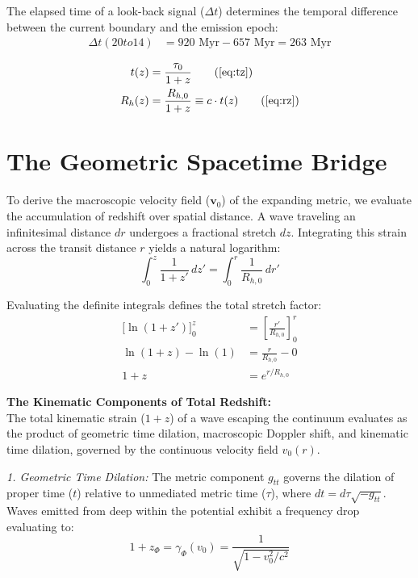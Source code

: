 The elapsed time of a look-back signal ($\Delta t$) determines the temporal difference between the current boundary and the emission epoch:
\begin{align}
    \Delta t(20 to 14) &= 920 \text{ Myr} - 657 \text{ Myr} =  263 \text{ Myr}
\end{align}

\begin{tcolorbox}[recallbox, title={\ref{box:chronometer}. The Redshift Chronometer}]
\begin{align}
    t(z) &= \frac{\tau_0}{1+z} \tag{\ref{eq:tz}} \\
    R_h(z) &= \frac{R_{h,0}}{1+z} \equiv c \cdot t(z) \tag{\ref{eq:rz}}
\end{align}
\end{tcolorbox}


\section{The Geometric Spacetime Bridge}
\label{sec:deriv_gr_bridge}
To derive the macroscopic velocity field ($\mathbf{v}_0$) of the expanding metric, we evaluate the accumulation of redshift over spatial distance. A wave traveling an infinitesimal distance $dr$ undergoes a fractional stretch $dz$. Integrating this strain across the transit distance $r$ yields a natural logarithm:
\begin{equation}
    \int_0^z \frac{1}{1+z'} \, dz' = \int_0^r \frac{1}{R_{h,0}} \, dr'
\end{equation}

Evaluating the definite integrals defines the total stretch factor:
\begin{align}
    \Big[ \ln(1+z') \Big]_0^z &= \left[ \frac{r'}{R_{h,0}} \right]_0^r \\
    \ln(1+z) - \ln(1) &= \frac{r}{R_{h,0}} - 0 \\
    1+z &= e^{r/R_{h,0}}
\end{align}

\vspace{0.2cm}
\textbf{The Kinematic Components of Total Redshift:} \\
The total kinematic strain ($1+z$) of a wave escaping the continuum evaluates as the product of geometric time dilation, macroscopic Doppler shift, and kinematic time dilation, governed by the continuous velocity field $v_0(r)$.

\textit{1. Geometric Time Dilation:} The metric component $g_{tt}$ governs the dilation of proper time ($t$) relative to unmediated metric time ($\tau$), where $dt = d\tau \sqrt{-g_{tt}}$. Waves emitted from deep within the potential exhibit a frequency drop evaluating to: %
\begin{equation}
    1 + z_{\Phi} = \gamma_{\Phi}(v_0) = \frac{1}{\sqrt{1 - v_0^2/c^2}}
\end{equation}

